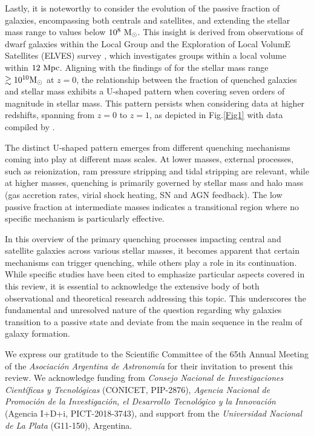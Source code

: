 \documentclass[baaa]{baaa}
\begin{document}
Lastly, it is noteworthy to consider the evolution of the passive fraction of galaxies, encompassing both centrals and satellites, and extending the stellar mass range to values below $10^8~{\rm M}_{\odot}$. This insight is derived from observations of dwarf galaxies within the Local Group \citep{Weisz_2015} and the Exploration of Local VolumE Satellites (ELVES) survey \citep{Greene_2023}, which investigates groups within a local volume within $12~{\rm Mpc}$. Aligning with the findings of \cite{Wetzel_2012} for the stellar mass range $\gtrsim 10^{10}{\rm M}_{\odot}$ at $z=0$, the relationship between the fraction of quenched galaxies and stellar mass exhibits a U-shaped pattern when covering seven orders of magnitude in stellar mass. This pattern persists when considering data at higher redshifts, spanning from $z = 0$ to $z = 1$, as depicted in Fig.\ref{Fig1} with data compiled by \cite{Weisz_2015}.

The distinct U-shaped pattern emerges from different quenching mechanisms coming into play at different mass scales. At lower masses, external processes, such as reionization, ram pressure stripping and tidal stripping are relevant, while at higher masses, quenching is primarily governed by stellar mass and halo mass (gas accretion rates, virial shock heating, SN and AGN feedback). The low passive fraction at intermediate masses indicates a transitional region where no specific mechanism is particularly effective.

In this overview of the primary quenching processes impacting central and satellite galaxies across various stellar masses, it becomes apparent that certain mechanisms can trigger quenching, while others play a role in its continuation. While specific studies have been cited to emphasize particular aspects covered in this review, it is essential to acknowledge the extensive body of both observational and theoretical research addressing this topic. This underscores the fundamental and unresolved nature of the question regarding why galaxies transition to a passive state and deviate from the main sequence in the realm of galaxy formation.







\begin{acknowledgement}
We express our gratitude to the Scientific Committee of the 65th Annual Meeting of the {\it Asociaci\'on Argentina de Astronom\'ia} for their invitation to present this review. We acknowledge funding from {\it Consejo Nacional de Investigaciones Científicas y Tecnológicas}  (CONICET, PIP-2876), {\it Agencia Nacional de Promoci\'on de la Investigaci\'on, el Desarrollo Tecnol\'ogico y la Innovaci\'on} (Agencia I+D+i, PICT-2018-3743), and support from the {\it Universidad Nacional de La Plata} (G11-150), Argentina.
\end{acknowledgement}
\end{document}
